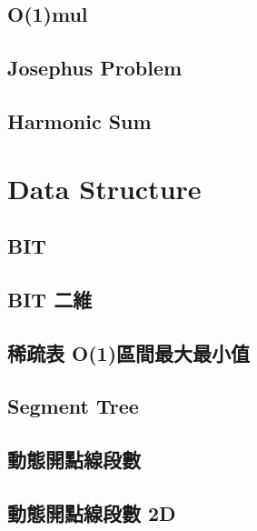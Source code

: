 \subsection{O(1)mul}


\subsection{Josephus Problem}


\subsection{Harmonic Sum}


\section{Data Structure}

\subsection{BIT}


\subsection{BIT 二維}


\subsection{稀疏表 O(1)區間最大最小值}


\subsection{Segment Tree}


\subsection{動態開點線段數}


\subsection{動態開點線段數 2D}


